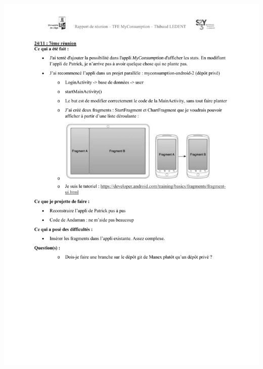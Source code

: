 \documentclass[a4paper, oneside, 11pt]{book}
\begin{document}
\includegraphics[width=1\textwidth]{reports_NB_Part7.pdf}
\newpage
\end{document}
